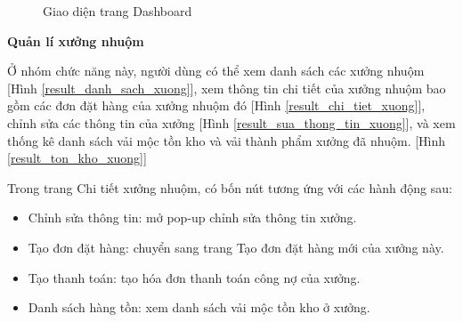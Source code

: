 \begin{figure}[H]
    \begin{center}
        \caption{Giao diện trang Dashboard}
        \label{result_dashboard}
    \end{center}
\end{figure}

\textbf{Quản lí xưởng nhuộm}

Ở nhóm chức năng này, người dùng có thể xem danh sách các xưởng nhuộm [Hình \ref{result_danh_sach_xuong}], xem thông tin chi tiết của xưởng nhuộm bao gồm các đơn đặt hàng của xưởng nhuộm đó [Hình \ref{result_chi_tiet_xuong}], chỉnh sửa các thông tin của xưởng [Hình \ref{result_sua_thong_tin_xuong}], và xem thống kê danh sách vải mộc tồn kho và vải thành phẩm xưởng đã nhuộm. [Hình \ref{result_ton_kho_xuong}]\par

Trong trang Chi tiết xưởng nhuộm, có bốn nút tương ứng với các hành động sau: 
\begin{itemize}
    \item Chỉnh sửa thông tin: mở pop-up chỉnh sửa thông tin xưởng.
    \item Tạo đơn đặt hàng: chuyển sang trang Tạo đơn đặt hàng mới của xưởng này.
    \item Tạo thanh toán: tạo hóa đơn thanh toán công nợ của xưởng.
    \item Danh sách hàng tồn: xem danh sách vải mộc tồn kho ở xưởng.
\end{itemize}

